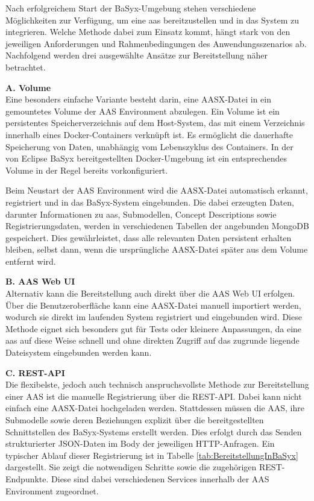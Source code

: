 Nach erfolgreichem Start der BaSyx-Umgebung stehen verschiedene Möglichkeiten zur Verfügung, um eine \acs{aas} bereitzustellen und in das System zu integrieren. 
Welche Methode dabei zum Einsatz kommt, hängt stark von den jeweiligen Anforderungen und Rahmenbedingungen des Anwendungsszenarios ab.
Nachfolgend werden drei ausgewählte Ansätze zur Bereitstellung näher betrachtet.

\noindent\textbf{A. Volume}\\
Eine besonders einfache Variante besteht darin, eine AASX-Datei in ein gemountetes Volume der AAS Environment abzulegen.
Ein Volume ist ein persistentes Speicherverzeichnis auf dem Host-System, das mit einem Verzeichnis innerhalb eines Docker-Containers verknüpft ist.
Es ermöglicht die dauerhafte Speicherung von Daten, unabhängig vom Lebenszyklus des Containers.
In der von Eclipse BaSyx bereitgestellten Docker-Umgebung ist ein entsprechendes Volume in der Regel bereits vorkonfiguriert.

Beim Neustart der AAS Environment wird die AASX-Datei automatisch erkannt, registriert und in das BaSyx-System eingebunden.
Die dabei erzeugten Daten, darunter Informationen zu \acs{aas}, Submodellen, Concept Descriptions sowie Registrierungsdaten, werden in verschiedenen Tabellen der angebunden MongoDB gespeichert.
Dies gewährleistet, dass alle relevanten Daten persistent erhalten bleiben, selbst dann, wenn die ursprüngliche AASX-Datei später aus dem Volume entfernt wird.

\noindent\textbf{B. AAS Web UI}\\
Alternativ kann die Bereitstellung auch direkt über die AAS Web UI erfolgen.
Über die Benutzeroberfläche kann eine AASX-Datei manuell importiert werden, wodurch sie direkt im laufenden System registriert und eingebunden wird.
Diese Methode eignet sich besonders gut für Tests oder kleinere Anpassungen, da eine \acs{aas} auf diese Weise schnell und ohne direkten Zugriff auf das zugrunde liegende Dateisystem eingebunden werden kann.

\noindent\textbf{C. REST-API}\\
Die flexibelste, jedoch auch technisch anspruchsvollste Methode zur Bereitstellung einer AAS ist die manuelle Registrierung über die REST-API. 
Dabei kann nicht einfach eine AASX-Datei hochgeladen werden. 
Stattdessen müssen die AAS, ihre Submodelle sowie deren Beziehungen explizit über die bereitgestellten Schnittstellen des BaSyx-Systems erstellt werden. 
Dies erfolgt durch das Senden strukturierter JSON-Daten im Body der jeweiligen HTTP-Anfragen.
Ein typischer Ablauf dieser Registrierung ist in Tabelle \ref{tab:BereitstellungInBaSyx} dargestellt. 
Sie zeigt die notwendigen Schritte sowie die zugehörigen REST-Endpunkte.
Diese sind dabei verschiedenen Services innerhalb der AAS Environment zugeordnet.

